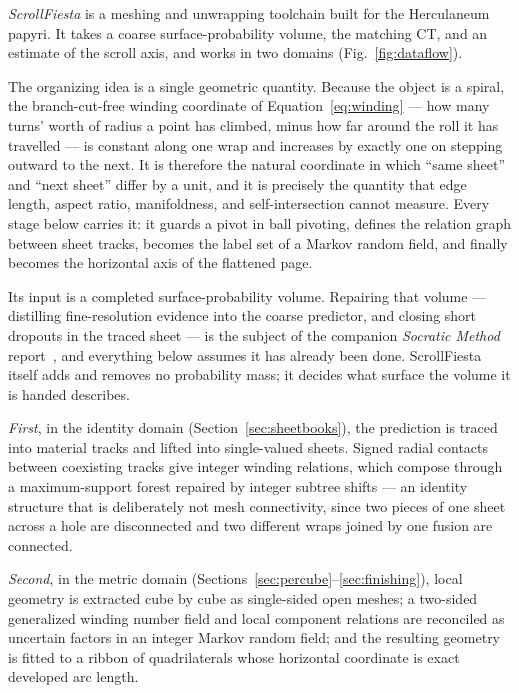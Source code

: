 {\em ScrollFiesta} is a meshing and unwrapping toolchain built for the Herculaneum papyri. It takes a coarse surface-probability volume, the matching CT, and an estimate of the scroll axis, and works in two domains (Fig.~\ref{fig:dataflow}).

The organizing idea is a single geometric quantity. Because the object is a spiral, the branch-cut-free winding coordinate of Equation~\eqref{eq:winding} --- how many turns' worth of radius a point has climbed, minus how far around the roll it has travelled --- is constant along one wrap and increases by exactly one on stepping outward to the next. It is therefore the natural coordinate in which ``same sheet'' and ``next sheet'' differ by a unit, and it is precisely the quantity that edge length, aspect ratio, manifoldness, and self-intersection cannot measure. Every stage below carries it: it guards a pivot in ball pivoting, defines the relation graph between sheet tracks, becomes the label set of a Markov random field, and finally becomes the horizontal axis of the flattened page.

Its input is a completed surface-probability volume. Repairing that volume --- distilling fine-resolution evidence into the coarse predictor, and closing short dropouts in the traced sheet --- is the subject of the companion \emph{Socratic Method} report~\cite{socraticmethod}, and everything below assumes it has already been done. ScrollFiesta itself adds and removes no probability mass; it decides what surface the volume it is handed describes.

\emph{First}, in the identity domain (Section~\ref{sec:sheetbooks}), the prediction is traced into material tracks and lifted into single-valued sheets. Signed radial contacts between coexisting tracks give integer winding relations, which compose through a maximum-support forest repaired by integer subtree shifts --- an identity structure that is deliberately not mesh connectivity, since two pieces of one sheet across a hole are disconnected and two different wraps joined by one fusion are connected.

\emph{Second}, in the metric domain (Sections~\ref{sec:percube}--\ref{sec:finishing}), local geometry is extracted cube by cube as single-sided open meshes; a two-sided generalized winding number field and local component relations are reconciled as uncertain factors in an integer Markov random field; and the resulting geometry is fitted to a ribbon of quadrilaterals whose horizontal coordinate is exact developed arc length.

